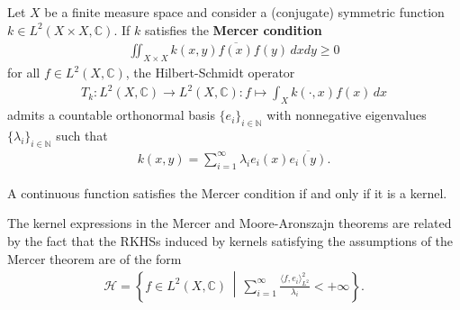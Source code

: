     \begin{theorem}[Mercer]
        Let $X$ be a finite measure space and consider a (conjugate) symmetric function $k\in L^2(X\times X,\mathbb{C})$. If $k$ satisfies the \textbf{Mercer condition}
        \begin{gather}
            \iint_{X\times X}k(x,y)\overline{f(x)}f(y)\,dxdy\geq0
        \end{gather}
        for all $f\in L^2(X,\mathbb{C})$, the Hilbert-Schmidt operator
        \begin{gather}
            T_k:L^2(X,\mathbb{C})\rightarrow L^2(X,\mathbb{C}):f\mapsto\int_Xk(\cdot,x)f(x)\,dx
        \end{gather}
        admits a countable orthonormal basis $\{e_i\}_{i\in\mathbb{N}}$ with nonnegative eigenvalues $\{\lambda_i\}_{i\in\mathbb{N}}$ such that
        \begin{gather}
            k(x,y) = \sum_{i=1}^\infty\lambda_ie_i(x)\overline{e_i(y)}.
        \end{gather}
    \end{theorem}
    \begin{theorem}[Bochner]
        A continuous function satisfies the Mercer condition if and only if it is a kernel.
    \end{theorem}


    \begin{remark}
        The kernel expressions in the Mercer and Moore-Aronszajn theorems are related by the fact that the RKHSs induced by kernels satisfying the assumptions of the Mercer theorem are of the form
        \begin{gather}
            \mathcal{H} = \left\{f\in L^2(X,\mathbb{C})\,\middle\vert\,\sum_{i=1}^\infty\frac{\langle f,e_i \rangle^2_{L^2}}{\lambda_i}<+\infty\right\}.
        \end{gather}
    \end{remark}

